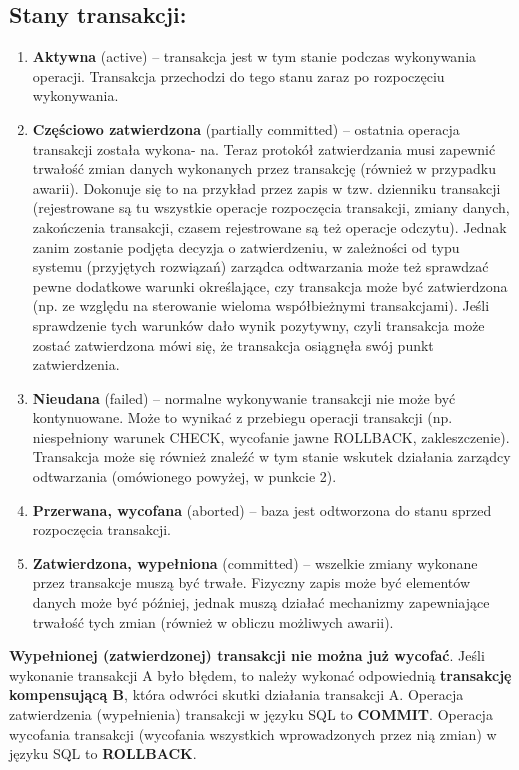 \documentclass[main.tex]{subfiles}
\begin{document}
    \subsection{Stany transakcji:}
    \begin{enumerate}
        \item \textbf{Aktywna} (active) – transakcja jest w tym stanie podczas wykonywania operacji. Transakcja
        przechodzi do tego stanu zaraz po rozpoczęciu wykonywania.

        \item \textbf{Częściowo zatwierdzona} (partially committed) – ostatnia operacja transakcji została wykona-
        na. Teraz protokół zatwierdzania musi zapewnić trwałość zmian danych wykonanych przez
        transakcję (również w przypadku awarii). Dokonuje się to na przykład przez zapis w tzw. dzienniku
        transakcji (rejestrowane są tu wszystkie operacje rozpoczęcia transakcji, zmiany danych,
        zakończenia transakcji, czasem rejestrowane są też operacje odczytu). Jednak zanim zostanie
        podjęta decyzja o zatwierdzeniu, w zależności od typu systemu (przyjętych rozwiązań) zarządca
        odtwarzania może też sprawdzać pewne dodatkowe warunki określające, czy transakcja może być
        zatwierdzona (np. ze względu na sterowanie wieloma współbieżnymi transakcjami). Jeśli
        sprawdzenie tych warunków dało wynik pozytywny, czyli transakcja może zostać zatwierdzona
        mówi się, że transakcja osiągnęła swój punkt zatwierdzenia.
        \item \textbf{Nieudana} (failed) – normalne wykonywanie transakcji nie może być kontynuowane. Może to wynikać z przebiegu operacji transakcji (np. niespełniony warunek CHECK, wycofanie jawne
        ROLLBACK, zakleszczenie). Transakcja może się również znaleźć w tym stanie wskutek działania
        zarządcy odtwarzania (omówionego powyżej, w punkcie 2).
        \item \textbf{Przerwana, wycofana} (aborted) – baza jest odtworzona do stanu sprzed rozpoczęcia
        transakcji.
        \item \textbf{Zatwierdzona, wypełniona} (committed) – wszelkie zmiany wykonane przez transakcje muszą
        być trwałe. Fizyczny zapis może być elementów danych może być później, jednak muszą działać
        mechanizmy zapewniające trwałość tych zmian (również w obliczu możliwych awarii).
    \end{enumerate}

    \textbf{Wypełnionej (zatwierdzonej) transakcji nie można już wycofać}. Jeśli wykonanie transakcji A
    było błędem, to należy wykonać odpowiednią \textbf{transakcję kompensującą B}, która odwróci skutki
    działania transakcji A.
    Operacja zatwierdzenia (wypełnienia) transakcji w języku SQL to \textbf{COMMIT}.
    Operacja wycofania transakcji (wycofania wszystkich wprowadzonych przez nią zmian) w języku
    SQL to \textbf{ROLLBACK}.
\end{document}
